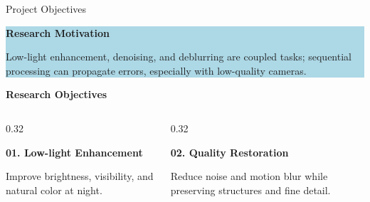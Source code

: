 ﻿\documentclass[
    11pt,%
    aspectratio=169,%
]{beamer}
\begin{document}
\begin{frame}{Project Objectives}
\small

\begin{beamercolorbox}[
    rounded=true,
    sep=0.06cm,
    wd=\textwidth
]{}
    \colorbox{LightBlue}{
        \parbox{\dimexpr\textwidth-2\fboxsep\relax}{
            {\color{Navy}\bfseries
            Research Motivation}

            \vspace{0.03cm}

            \fontsize{9}{11}\selectfont
            Low-light enhancement, denoising, and deblurring are
            coupled tasks; sequential processing can propagate errors,
            especially with low-quality cameras.
        }
    }
\end{beamercolorbox}

\vspace{0.18cm}

{\color{Navy}\bfseries Research Objectives}
\vspace{0.07cm}
\begin{columns}[T, onlytextwidth]
    \begin{column}{0.32\textwidth}
        \begin{beamercolorbox}[
            rounded=true,
            sep=0.10cm,
            wd=\linewidth
        ]{}
            {\color{orange!85!black}\bfseries 01. Low-light Enhancement}

            \vspace{0.07cm}

            \fontsize{8.5}{10}\selectfont
            Improve brightness, visibility, and natural color at night.
        \end{beamercolorbox}
    \end{column}

    \begin{column}{0.32\textwidth}
        \begin{beamercolorbox}[
            rounded=true,
            sep=0.10cm,
            wd=\linewidth
        ]{}
            {\color{orange!85!black}\bfseries 02. Quality Restoration}

            \vspace{0.07cm}

            \fontsize{8.5}{10}\selectfont
            Reduce noise and motion blur while preserving structures
            and fine detail.
        \end{beamercolorbox}
    \end{column}


\end{columns}
\end{frame}
\end{document}
